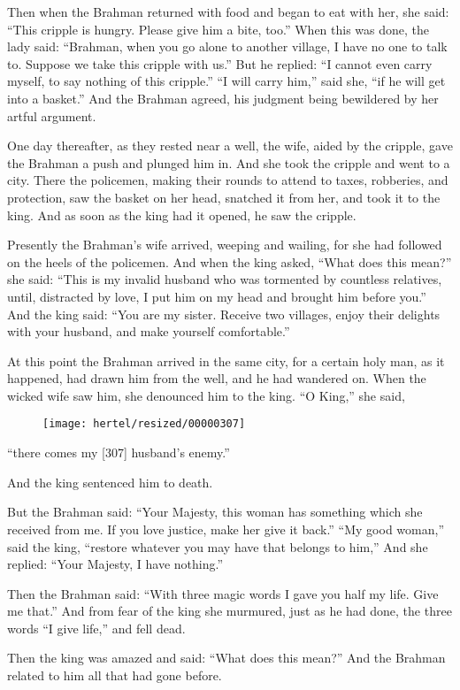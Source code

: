 \documentclass[article, twoside, 10pt]{memoir}
\begin{document}
Then when the Brahman returned with food and began to eat with her,
she said: ``This cripple is hungry. Please give him a bite, too.''
When this was done, the lady said:
``Brahman, when you go alone to another village, I have no one to talk to. Suppose we take this cripple with us.''
But he replied:
``I cannot even carry myself, to say nothing of this cripple.''
``I will carry him,'' said she, ``if he will get into a basket.''
And the Brahman agreed, his judgment being bewildered by her artful
argument.

One day thereafter, as they rested near a well, the wife, aided by
the cripple, gave the Brahman a push and plunged him in. And she
took the cripple and went to a city. There the policemen, making
their rounds to attend to taxes, robberies, and protection, saw the
basket on her head, snatched it from her, and took it to the king.
And as soon as the king had it opened, he saw the cripple.

Presently the Brahman's wife arrived, weeping and wailing, for she
had followed on the heels of the policemen. And when the king
asked, ``What does this mean?'' she said:
``This is my invalid husband who was tormented by countless relatives, until, distracted by love, I put him on my head and brought him before you.''
And the king said:
``You are my sister. Receive two villages, enjoy their delights with your husband, and make yourself comfortable.''

At this point the Brahman arrived in the same city, for a certain
holy man, as it happened, had drawn him from the well, and he had
wandered on. When the wicked wife saw him, she denounced him to the
king. ``O King,'' she said,
\begin{figure}[p]\texttt{[image: hertel/resized/00000307]}\end{figure}``there comes my [307] husband's enemy.''

And the king sentenced him to death.

But the Brahman said:
``Your Majesty, this woman has something which she received from me. If you love justice, make her give it back.''
``My good woman,'' said the king,
``restore whatever you may have that belongs to him,'' And she
replied: ``Your Majesty, I have nothing.''

Then the Brahman said:
``With three magic words I gave you half my life. Give me that.''
And from fear of the king she murmured, just as he had done, the
three words ``I give life,'' and fell dead.

Then the king was amazed and said: ``What does this mean?'' And the
Brahman related to him all that had gone before.
\end{document}
